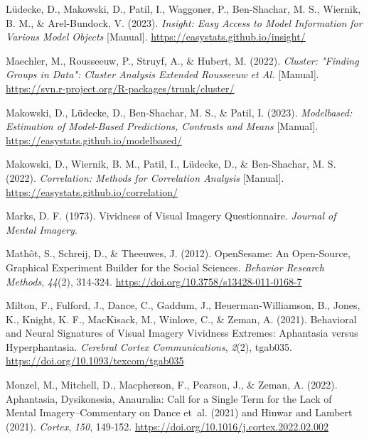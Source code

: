 \documentclass[
  12pt,
]{article}
\newlength{\cslhangindent}
\newlength{\cslentryspacingunit} %
\newenvironment{CSLReferences}[2] %
 {%
  \setlength{\parindent}{0pt}
  \ifodd #1
  \let\oldpar\par
  \def\par{\hangindent=\cslhangindent\oldpar}
  \fi
  \setlength{\parskip}{#2\cslentryspacingunit}
 }%
 {}
\begin{document}
\begin{CSLReferences}{1}{0}
\leavevmode{}%
Lüdecke, D., Makowski, D., Patil, I., Waggoner, P., Ben-Shachar, M. S.,
Wiernik, B. M., \& Arel-Bundock, V. (2023). \emph{Insight: {Easy} Access
to Model Information for Various Model Objects} {[}Manual{]}.
\url{https://easystats.github.io/insight/}

\leavevmode{}%
Maechler, M., Rousseeuw, P., Struyf, A., \& Hubert, M. (2022).
\emph{Cluster: "{Finding Groups} in {Data}": {Cluster} Analysis Extended
Rousseeuw et Al.} {[}Manual{]}.
\url{https://svn.r-project.org/R-packages/trunk/cluster/}

\leavevmode{}%
Makowski, D., Lüdecke, D., Ben-Shachar, M. S., \& Patil, I. (2023).
\emph{Modelbased: {Estimation} of Model-Based Predictions, Contrasts and
Means} {[}Manual{]}. \url{https://easystats.github.io/modelbased/}

\leavevmode{}%
Makowski, D., Wiernik, B. M., Patil, I., Lüdecke, D., \& Ben-Shachar, M.
S. (2022). \emph{Correlation: {Methods} for Correlation Analysis}
{[}Manual{]}. \url{https://easystats.github.io/correlation/}

\leavevmode{}%
Marks, D. F. (1973). Vividness of Visual Imagery {Questionnaire}.
\emph{Journal of Mental Imagery}.

\leavevmode{}%
Mathôt, S., Schreij, D., \& Theeuwes, J. (2012). {OpenSesame}: {An}
Open-Source, Graphical Experiment Builder for the Social Sciences.
\emph{Behavior Research Methods}, \emph{44}(2), 314‑324.
\url{https://doi.org/10.3758/s13428-011-0168-7}

\leavevmode{}%
Milton, F., Fulford, J., Dance, C., Gaddum, J., Heuerman-Williamson, B.,
Jones, K., Knight, K. F., MacKisack, M., Winlove, C., \& Zeman, A.
(2021). Behavioral and {Neural Signatures} of {Visual Imagery Vividness
Extremes}: {Aphantasia} versus {Hyperphantasia}. \emph{Cerebral Cortex
Communications}, \emph{2}(2), tgab035.
\url{https://doi.org/10.1093/texcom/tgab035}

\leavevmode{}%
Monzel, M., Mitchell, D., Macpherson, F., Pearson, J., \& Zeman, A.
(2022). Aphantasia, Dysikonesia, Anauralia: Call for a Single Term for
the Lack of Mental Imagery--{Commentary} on {Dance} et~al. (2021) and
{Hinwar} and {Lambert} (2021). \emph{Cortex}, \emph{150}, 149‑152.
\url{https://doi.org/10.1016/j.cortex.2022.02.002}


\end{CSLReferences}
\end{document}
